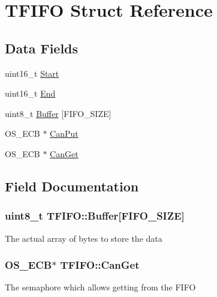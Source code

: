 \hypertarget{struct_t_f_i_f_o}{}\section{T\+F\+I\+F\+O Struct Reference}
\label{struct_t_f_i_f_o}
\subsection*{Data Fields}
\begin{DoxyCompactItemize}
\item 
uint16\+\_\+t \hyperlink{struct_t_f_i_f_o_a092a7559431a12616672354641908167}{Start}
\item 
uint16\+\_\+t \hyperlink{struct_t_f_i_f_o_a5063b875898a6f23a97aa3ca17f0544b}{End}
\item 
uint8\+\_\+t \hyperlink{struct_t_f_i_f_o_a5a9d712880dc4f1d5571b96452cd85f8}{Buffer} \mbox{[}F\+I\+F\+O\+\_\+\+S\+I\+Z\+E\mbox{]}
\item 
O\+S\+\_\+\+E\+C\+B $\ast$ \hyperlink{struct_t_f_i_f_o_a9f4fd72a0313ed8a98e22198171c2fc5}{Can\+Put}
\item 
O\+S\+\_\+\+E\+C\+B $\ast$ \hyperlink{struct_t_f_i_f_o_a1a71a4db58cc625d3160889d91a33125}{Can\+Get}
\end{DoxyCompactItemize}


\subsection{Field Documentation}
\hypertarget{struct_t_f_i_f_o_a5a9d712880dc4f1d5571b96452cd85f8}{}
\subsubsection[{Buffer}]{\setlength{\rightskip}{0pt plus 5cm}uint8\+\_\+t T\+F\+I\+F\+O\+::\+Buffer\mbox{[}F\+I\+F\+O\+\_\+\+S\+I\+Z\+E\mbox{]}}\label{struct_t_f_i_f_o_a5a9d712880dc4f1d5571b96452cd85f8}
The actual array of bytes to store the data \hypertarget{struct_t_f_i_f_o_a1a71a4db58cc625d3160889d91a33125}{}
\subsubsection[{Can\+Get}]{\setlength{\rightskip}{0pt plus 5cm}O\+S\+\_\+\+E\+C\+B$\ast$ T\+F\+I\+F\+O\+::\+Can\+Get}\label{struct_t_f_i_f_o_a1a71a4db58cc625d3160889d91a33125}
The semaphore which allows getting from the F\+I\+F\+O \hypertarget{struct_t_f_i_f_o_a9f4fd72a0313ed8a98e22198171c2fc5}{}
